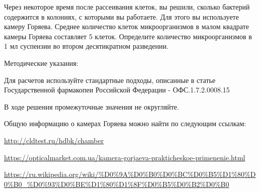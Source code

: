 
Через некоторое время после рассеивания клеток, вы решили, сколько бактерий содержится в колониях, с которыми вы работаете. Для этого вы используете камеру Горяева. Среднее количество клеток микроорганизмов в малом квадрате камеры Горяева составляет 5 клеток. Определите количество микроорганизмов в 1 мл суспензии во втором десятикратном разведении.

Методические указания: 

Для расчетов используйте стандартные подходы, описанные в статье Государственной фармакопеи Российской Федерации - ОФС.1.7.2.0008.15 

В ходе решения промежуточные значения не округляйте. 

Общую информацию о камерах Горяева можно найти по следующим ссылкам:

\noindent\url{http://cldtest.ru/hdbk/chamber}

\noindent\url{https://opticalmarket.com.ua/kamera-gorjaeva-prakticheskoe-primenenie.html}

\noindent\url{https://ru.wikipedia.org/wiki/%D0%9A%D0%B0%D0%BC%D0%B5%D1%80%D0%B0_%D0%93%D0%BE%D1%80%D1%8F%D0%B5%D0%B2%D0%B0}